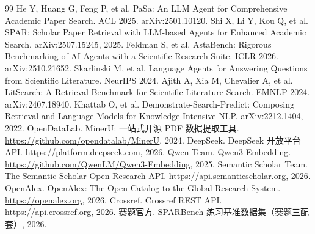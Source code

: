 \documentclass[12pt,a4paper]{ctexart}
\begin{document}
\begin{thebibliography}{99}\small
{} He Y, Huang G, Feng P, et al. PaSa: An LLM Agent for Comprehensive Academic Paper Search. ACL 2025. arXiv:2501.10120.
 Shi X, Li Y, Kou Q, et al. SPAR: Scholar Paper Retrieval with LLM-based Agents for Enhanced Academic Search. arXiv:2507.15245, 2025.
 Feldman S, et al. AstaBench: Rigorous Benchmarking of AI Agents with a Scientific Research Suite. ICLR 2026. arXiv:2510.21652.
 Skarlinski M, et al. Language Agents for Answering Questions from Scientific Literature. NeurIPS 2024.
 Ajith A, Xia M, Chevalier A, et al. LitSearch: A Retrieval Benchmark for Scientific Literature Search. EMNLP 2024. arXiv:2407.18940.
 Khattab O, et al. Demonstrate-Search-Predict: Composing Retrieval and Language Models for Knowledge-Intensive NLP. arXiv:2212.1404, 2022.
 OpenDataLab. MinerU: 一站式开源 PDF 数据提取工具. \url{https://github.com/opendatalab/MinerU}, 2024.
 DeepSeek. DeepSeek 开放平台 API. \url{https://platform.deepseek.com}, 2026.
 Qwen Team. Qwen3-Embedding. \url{https://github.com/QwenLM/Qwen3-Embedding}, 2025.
 Semantic Scholar Team. The Semantic Scholar Open Research API. \url{https://api.semanticscholar.org}, 2026.
 OpenAlex. OpenAlex: The Open Catalog to the Global Research System. \url{https://openalex.org}, 2026.
 Crossref. Crossref REST API. \url{https://api.crossref.org}, 2026.
 赛题官方. SPARBench 练习基准数据集（赛题三配套）, 2026.
\end{thebibliography}
\end{document}
